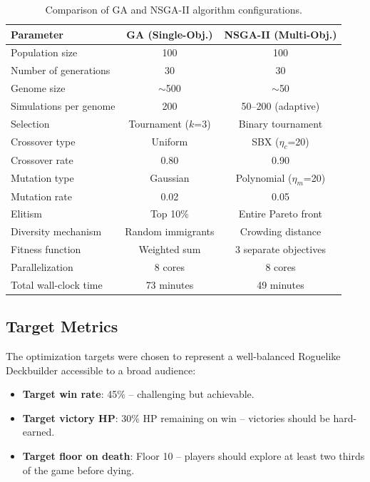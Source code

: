 \begin{table}[H]
    \centering
    \caption{Comparison of GA and NSGA-II algorithm configurations.}
    \label{tab:alg_params}
    \begin{tabular}{lcc}
        \toprule
        \textbf{Parameter}            & \textbf{GA (Single-Obj.)} & \textbf{NSGA-II (Multi-Obj.)} \\
        \midrule
        Population size               & 100        & 100 \\
        Number of generations         & 30         & 30 \\
        Genome size                   & $\sim$500  & $\sim$50 \\
        Simulations per genome        & 200        & 50--200 (adaptive) \\
        Selection                     & Tournament ($k$=3) & Binary tournament \\
        Crossover type                & Uniform    & SBX ($\eta_c$=20) \\
        Crossover rate                & 0.80       & 0.90 \\
        Mutation type                 & Gaussian   & Polynomial ($\eta_m$=20) \\
        Mutation rate                 & 0.02       & 0.05 \\
        Elitism                       & Top 10\%   & Entire Pareto front \\
        Diversity mechanism           & Random immigrants & Crowding distance \\
        Fitness function              & Weighted sum & 3 separate objectives \\
        Parallelization               & 8 cores    & 8 cores \\
        Total wall-clock time         & 73 minutes & 49 minutes \\
        \bottomrule
    \end{tabular}
\end{table}

\subsection{Target Metrics}

The optimization targets were chosen to represent a well-balanced Roguelike Deckbuilder accessible to a broad audience:
\begin{itemize}
    \item \textbf{Target win rate}: 45\% -- challenging but achievable.
    \item \textbf{Target victory HP}: 30\% HP remaining on win -- victories should be hard-earned.
    \item \textbf{Target floor on death}: Floor 10 -- players should explore at least two thirds of the game before dying.
\end{itemize}

